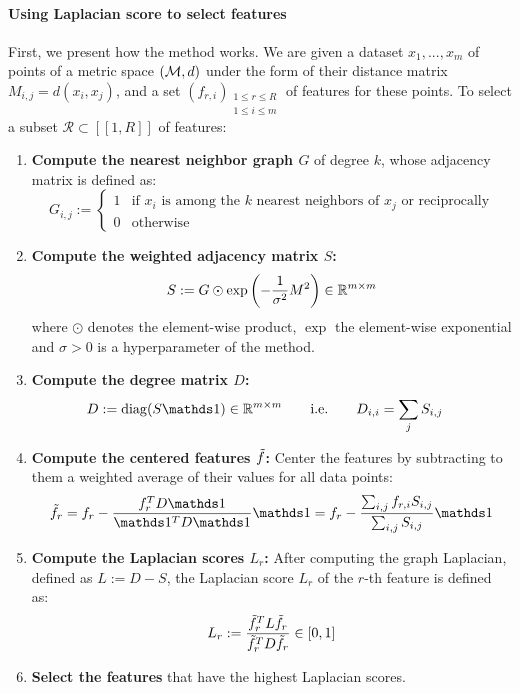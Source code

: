 \documentclass[11pt]{article}
\begin{document}
\paragraph{Using Laplacian score to select features} First, we present how the method works. We are given a dataset $x_1, ..., x_m$ of points of a metric space $(\mathcal{M}, d)$ under the form of their distance matrix $M_{i,j} = d(x_i, x_j)$, and a set $(f_{r,i})_{\substack{1\leq r \leq R \\ 1 \leq i \leq m}}$ of features for these points. To select a subset $\mathcal{R} \subset [\![ 1, R ]\!]$ of features:

\begin{enumerate}
    \item \textbf{Compute the nearest neighbor graph $G$} of degree $k$, whose adjacency matrix is defined as: 
    $$G_{i,j} := \begin{cases} 
        1 & \text{if $x_i$ is among the $k$ nearest neighbors of $x_j$ or reciprocally} \\
        0 & \text{otherwise}
    \end{cases}$$
    \item \textbf{Compute the weighted adjacency matrix $S$:}
    $$S := G \odot \exp\left(- \frac 1 {\sigma^2} M^2 \right) \in \mathbb{R}^{m\times m}$$
    where $\odot$ denotes the element-wise product, $\exp$ the element-wise exponential and $\sigma > 0$ is a hyperparameter of the method.
    \item \textbf{Compute the degree matrix $D$:}
    \begin{align*}
        D &:= \diag(S\one) \in \RR^{m\times m} \ \ \ \ \ \ \text{i.e.} \ \ \ \ \ \  D_{i,i} = \sum_j S_{i, j}
    \end{align*}
    \item \textbf{Compute the centered features $\Tilde{f}$:} Center the features by subtracting to them a weighted average of their values for all data points:
    \begin{equation*}
        \Tilde{f}_r = f_r - \frac {f_r^T D \one} {\one^T D \one} \one = f_r - \frac {\sum_{i, j} f_{r, i} S_{i, j}} {\sum_{i, j} S_{i, j}} \one
    \end{equation*}
    \item \textbf{Compute the Laplacian scores $L_r$:} After computing the graph Laplacian, defined as $L := D - S$, the Laplacian score $L_r$ of the $r$-th feature is defined as:
    $$L_r := \frac{\Tilde{f}_r^T L \Tilde{f}_r}{\Tilde{f}_r^T D \Tilde{f}_r} \in [0, 1]$$
    \item \textbf{Select the features} that have the highest Laplacian scores.
\end{enumerate}
\end{document}
